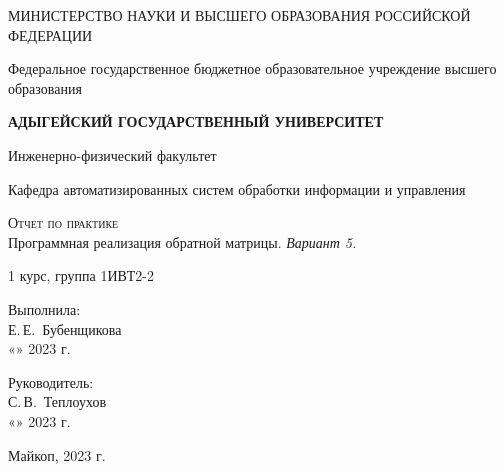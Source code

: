 \documentclass[12pt,a4paper]{scrartcl}
\begin{document}
 \begin{titlepage}
  \begin{center}
   \large
   МИНИСТЕРСТВО НАУКИ И ВЫСШЕГО ОБРАЗОВАНИЯ РОССИЙСКОЙ ФЕДЕРАЦИИ
   
   Федеральное государственное бюджетное образовательное учреждение высшего образования
   
   \textbf{АДЫГЕЙСКИЙ ГОСУДАРСТВЕННЫЙ УНИВЕРСИТЕТ}
   \vspace{0.25cm}
   
   Инженерно-физический факультет
   
   Кафедра автоматизированных систем обработки информации и управления
   \vfill

   \vfill
   
   \textsc{Отчет по практике}\\[5mm]
   
   {\LARGE Программная реализация обратной матрицы. \textit{Вариант 5.}}
   \bigskip
   
   1 курс, группа 1ИВТ2-2
  \end{center}
  \vfill
  
  \newlength{\ML}
  \hfill\begin{minipage}{0.5\textwidth}
   Выполнила:\\
   \underline{\hspace{\ML}} Е.\,Е.~Бубенщикова\\
   «\underline{\hspace{0.7cm}}» \underline{\hspace{2cm}} 2023 г.
  \end{minipage}%
  \bigskip
  
  \hfill\begin{minipage}{0.5\textwidth}
   Руководитель:\\
   \underline{\hspace{\ML}} С.\,В.~Теплоухов\\
   «\underline{\hspace{0.7cm}}» \underline{\hspace{2cm}} 2023 г.
  \end{minipage}%
  \vfill
  
  \begin{center}
   Майкоп, 2023 г.
  \end{center}
 \end{titlepage}
 
\end{document}
